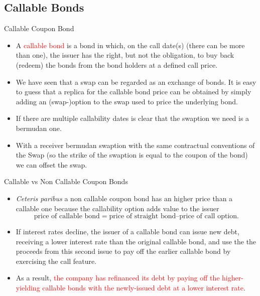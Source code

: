 \documentclass{beamer}
\begin{document}
\subsection{Callable Bonds}
\begin{frame}{Callable Coupon Bond}
\begin{itemize}
	\item A \textcolor{red}{callable bond} is a bond in which, on the call date(s) (there can be more than one), the issuer has the right, but not the obligation, to buy back (redeem) the bonds from the bond holders at a defined call price.
	\item We have seen that a swap can be regarded as an exchange of bonds. It is easy to guess that a replica for the callable bond price can be obtained by simply adding an (swap-)option to the swap used to price the underlying bond.
	\item If there are multiple callability dates is clear that the swaption we need is a bermudan one.
	\item With a receiver bermudan swaption with the same contractual conventions of the Swap (so the strike of the swaption is equal to the coupon of the bond) we can offset the swap. %
\end{itemize}
\end{frame}

\begin{frame}{Callable vs Non Callable Coupon Bonds}
\begin{itemize}
	\item \emph{Ceteris paribus} a non callable coupon bond has an higher price than a callable one because the callability option adds value to the issuer
	\begin{equation*}
		\text{price of callable bond} = \text{price of straight bond} – \text{price of call option}.
	\end{equation*}
	\item If interest rates decline, the issuer of a callable bond can issue new debt, receiving a lower interest rate than the original callable bond, and use the the proceeds from this second issue to pay off the earlier callable bond by exercising the call feature.
	\item As a result, \textcolor{red}{the company has refinanced its debt by paying off the higher-yielding callable bonds with the newly-issued debt at a lower interest rate}.		
\end{itemize}
\end{frame}
\end{document}
